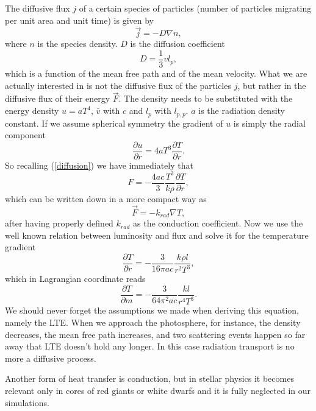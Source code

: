The diffusive flux $j$ of a certain species of particles (number of particles migrating per unit area and unit time) is given by
\begin{equation}\label{diffusion}
	\vec  j=-D \nabla n,
\end{equation}
where $n$ is the species density. $D$ is the diffusion coefficient
\begin{equation}
	D =\frac{1}{3} v l_{p},
\end{equation}
which is a function of the mean free path and of the mean velocity. What we are actually interested in is not the diffusive flux of the particles $j$, but rather in the diffusive flux of their energy $\vec F$. The density needs to be substituted with the energy density $u=aT^4$, $\bar v$ with $c$ and $l_p$ with $l_{p,p}$. $a$ is the radiation density constant. If we assume spherical symmetry the gradient of $u$ is simply the radial component
\begin{equation}
	\frac{\partial u}{\partial r} = 4  a  T^3   \frac{\partial T}{\partial r}.
\end{equation}
So recalling (\ref{diffusion}) we have immediately that
\begin{equation}
	F=-\frac{4ac}{3}\frac{T^3}{k \rho} \frac{\partial T}{\partial r},
\end{equation}
which can be written down in a more compact way as 
\begin{equation}
	\vec F = - k_{rad} \nabla T,
\end{equation}
after having properly defined $k_{rad}$ as the conduction coefficient. Now we use the well known relation between luminosity and flux and solve it for the temperature gradient
\begin{equation}
	\frac{\partial T}{\partial r}= - \frac{3}{16 \pi a c}\frac{k \rho l}{r^2 T^3},
\end{equation}
which in Lagrangian coordinate reads
\begin{equation}\label{partialTpartialm}
	\frac{\partial T}{\partial m}= - \frac{3}{64 \pi^2 a c}\frac{k l}{r^4 T^3}.
\end{equation}
We should never forget the assumptions we made when deriving this equation, namely the LTE. When we approach the photosphere, for instance, the density decreases, the mean free path increases, and two scattering events happen so far away that LTE doesn't hold any longer. In this case radiation transport is no more a diffusive process. 

Another form of heat transfer is conduction, but in stellar physics it becomes relevant only in cores of red giants or white dwarfs and it is fully neglected in our simulations.

